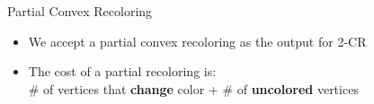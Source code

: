 \begin{frame}{Partial Convex Recoloring}
\begin{itemize}

\item
We accept a partial convex recoloring as the output for 2-CR  

\pause\item
The cost of a partial recoloring is:
\\
\# of vertices that \textbf{change} color
+
\# of \textbf{uncolored} vertices 


\end{itemize}
\end{frame}